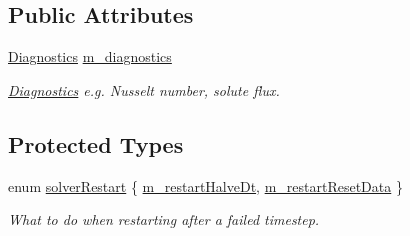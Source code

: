 \subsection*{Public Attributes}
\begin{DoxyCompactItemize}
\item 
\mbox{\label{class_a_m_r_level_mushy_layer_a280fdf87f2f58ddc25250fff6b6c9f19}} 
\hyperlink{class_diagnostics}{Diagnostics} \hyperlink{class_a_m_r_level_mushy_layer_a280fdf87f2f58ddc25250fff6b6c9f19}{m\+\_\+diagnostics}
\begin{DoxyCompactList}\small\item\em \hyperlink{class_diagnostics}{Diagnostics} e.\+g. Nusselt number, solute flux. \end{DoxyCompactList}\end{DoxyCompactItemize}
\subsection*{Protected Types}
\begin{DoxyCompactItemize}
\item 
enum \hyperlink{class_a_m_r_level_mushy_layer_ae580be53bf92a5bad64ba0032282458b}{solver\+Restart} \{ \hyperlink{class_a_m_r_level_mushy_layer_ae580be53bf92a5bad64ba0032282458bae62a0ef77c0cf96f38983824de51f8d5}{m\+\_\+restart\+Halve\+Dt}, 
\hyperlink{class_a_m_r_level_mushy_layer_ae580be53bf92a5bad64ba0032282458ba0d29913c8280770cbd3501f7d3f0963a}{m\+\_\+restart\+Reset\+Data}
 \}\begin{DoxyCompactList}\small\item\em What to do when restarting after a failed timestep. \end{DoxyCompactList}
\end{DoxyCompactItemize}
